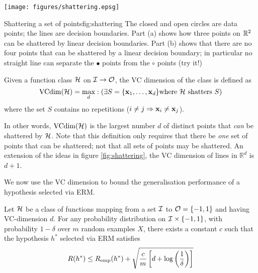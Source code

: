 \begin{linefigure}
\begin{center}
\texttt{[image: figures/shattering.epsg]}
\end{center}
\begin{capt}{Shattering a set of points}{fig:shattering}
The closed and open circles are data points; the lines are decision
boundaries.  Part (a) shows how three points on $\mathbb{R}^2$ can be
shattered by linear decision boundaries.  Part (b) shows that there
are no four points that can be shattered by a linear decision
boundary; in particular no straight line can separate the $\bullet$
points from the $\circ$ points (try it!)
\end{capt}
\end{linefigure}

\begin{definition}[VC dimension]
\label{thm:vcdim bound}
Given a function class $\mathcal{H}$ on $\mathcal{I} \rightarrow \mathcal{O}$, the VC
dimension of the class is defined as
%
\begin{equation}
\mathrm{VCdim}(\mathcal{H}) = \max_{d} : ( \exists S = \{\mathbf{x}_1, \ldots, \mathbf{x}_d\} 
\mbox{\rm where $\mathcal{H}$ shatters $S$})
\end{equation}
%
where the set $S$ contains no repetitions ($i \neq j \Rightarrow
\mathbf{x}_i \neq \mathbf{x}_j$).
\end{definition}

In other words, $\mathrm{VCdim}(\mathcal{H})$ is the largest number $d$ of distinct
points that \emph{can} be shattered by $\mathcal{H}$.  Note that this
definition only requires that there be \emph{one} set of points that
can be shattered; not that all sets of points may be shattered.  An
extension of the ideas in figure \ref{fig:shattering}, the VC
dimension of lines in $\mathbb{R}^d$ is $d+1$.

We now use the VC dimension to bound the generalisation performance of
a hypothesis selected via ERM.

\begin{theorem}
Let $\mathcal{H}$ be a class of functions mapping from a set $\mathcal{I}$ to $\mathcal{O} =
\{-1, 1\}$ and having VC-dimension $d$.  For any probability
distribution on $\mathcal{I} \times \{-1,1\}$, with probability $1-\delta$
over $m$ random examples $X$, there exists a constant $c$ such that
the hypothesis $h^{\ast}$ selected via ERM satisfies
\begin{equation}
R(h^{\ast}) \leq R_{\mathrm{emp}}(h^{\ast}) + \sqrt{ \frac{c}{m} \left[ d
+ \log \left ( \frac{1}{\delta} \right) \right] }
\end{equation}
\end{theorem}

